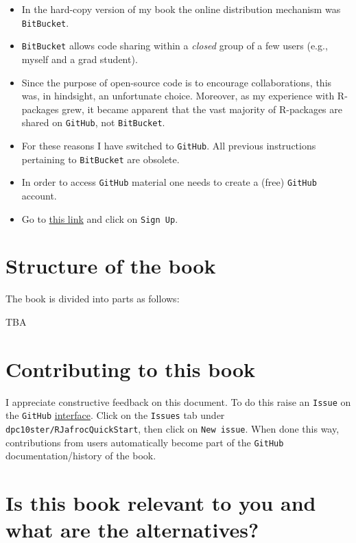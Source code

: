 \documentclass[
]{book}
\providecommand{\tightlist}{%
  \setlength{\itemsep}{0pt}\setlength{\parskip}{0pt}}
\begin{document}
\begin{itemize}
\tightlist
\item
  In the hard-copy version of my book \citep{chakraborty2017observer} the online distribution mechanism was \texttt{BitBucket}.
\item
  \texttt{BitBucket} allows code sharing within a \emph{closed} group of a few users (e.g., myself and a grad student).
\item
  Since the purpose of open-source code is to encourage collaborations, this was, in hindsight, an unfortunate choice. Moreover, as my experience with R-packages grew, it became apparent that the vast majority of R-packages are shared on \texttt{GitHub}, not \texttt{BitBucket}.
\item
  For these reasons I have switched to \texttt{GitHub}. All previous instructions pertaining to \texttt{BitBucket} are obsolete.
\item
  In order to access \texttt{GitHub} material one needs to create a (free) \texttt{GitHub} account.
\item
  Go to \href{https://github.com}{this link} and click on \texttt{Sign\ Up}.
\end{itemize}

\hypertarget{structure-of-the-book}{%
\section*{Structure of the book}\label{structure-of-the-book}}

The book is divided into parts as follows:

TBA

\hypertarget{contributing-to-this-book}{%
\section*{Contributing to this book}\label{contributing-to-this-book}}

I appreciate constructive feedback on this document. To do this raise an \texttt{Issue} on the \texttt{GitHub} \href{https://github.com/dpc10ster/RJafrocQuickStart}{interface}. Click on the \texttt{Issues} tab under \texttt{dpc10ster/RJafrocQuickStart}, then click on \texttt{New\ issue}. When done this way, contributions from users automatically become part of the \texttt{GitHub} documentation/history of the book.

\hypertarget{is-this-book-relevant-to-you-and-what-are-the-alternatives}{%
\section*{Is this book relevant to you and what are the alternatives?}\label{is-this-book-relevant-to-you-and-what-are-the-alternatives}}
\end{document}
